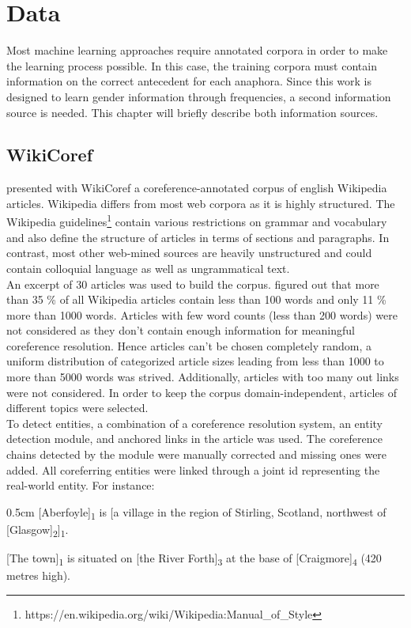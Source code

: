 \chapter{Data}
\label{sec:Data}

Most machine learning approaches require annotated corpora in order to make the learning process possible. In this case, the training corpora must contain information on the correct antecedent for each anaphora. Since this work is designed to learn gender information through frequencies, a second information source is needed. This chapter will briefly describe both information sources.

\section{WikiCoref }
\cite{wikicoref2016} presented with WikiCoref a coreference-annotated corpus of english Wikipedia articles. Wikipedia differs from most web corpora as it is highly structured. The Wikipedia guidelines\footnote{https://en.wikipedia.org/wiki/Wikipedia:Manual\_of\_Style} contain various restrictions on grammar and vocabulary and also define the structure of articles in terms of sections and paragraphs. In contrast, most other web-mined sources are heavily unstructured and could contain colloquial language as well as ungrammatical text. \\
An excerpt of 30 articles was used to build the corpus. \citep{wikicoref2016} figured out that more than 35 \% of all Wikipedia articles contain less than 100 words and only 11 \% more than 1000 words. Articles with few word counts (less than 200 words) were not considered as they don't contain enough information for meaningful coreference resolution. Hence articles can't be chosen completely random, a uniform distribution of categorized article sizes leading from less than 1000 to more than 5000 words was strived. Additionally, articles with too many out links were not considered. In order to keep the corpus domain-independent, articles of different topics were selected.\\

To detect entities, a combination of a coreference resolution system, an entity detection module, and anchored links in the article was used. The coreference chains detected by the module were manually corrected and missing ones were added. All coreferring entities were linked through a joint id representing the real-world entity. For instance: 

\begin{addmargin}[0.5cm]{0.5cm}
[Aberfoyle]\textsubscript{1} is [a village in the region of Stirling, Scotland, northwest of [Glasgow]\textsubscript{2}]\textsubscript{1}.

[The town]\textsubscript{1} is situated on [the River Forth]\textsubscript{3} at the base of [Craigmore]\textsubscript{4} (420 metres high).
\end{addmargin}

